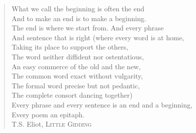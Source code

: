 \begin{quote}
\footnotesize
\noindent What we call the beginning is often the end \\[0.8ex]
And to make an end is to make a beginning. \\[0.8ex]
The end is where we start from. And every phrase  \\[0.8ex]
And sentence that is right (where every word is at home, \\[0.8ex]
Taking its place to support the others,\\[0.8ex]
The word neither diffident nor ostentatious, \\[0.8ex]
An easy commerce of the old and the new,\\[0.8ex]
The common word exact without vulgarity, \\[0.8ex]
The formal word precise but not pedantic,\\[0.8ex]
The complete consort dancing together)\\[0.8ex]
Every phrase and every sentence is an end and a beginning, \\[0.8ex]
Every poem an epitaph.\\[2ex]
\scriptsize T.S. Eliot, \textsc{Little Gidding} \\
\end{quote}


